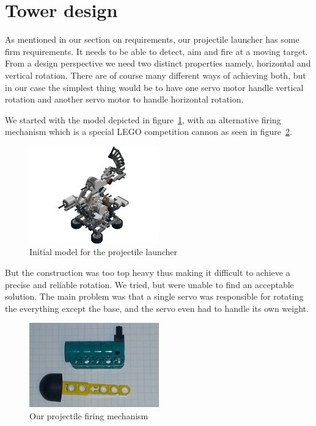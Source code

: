 \section{Tower design}
\label{turretdesign}
As mentioned in our section on requirements, our projectile launcher has some firm requirements. It needs to be able to detect, aim and fire at a moving target. 
From a design perspective we need two distinct properties namely, horizontal and vertical rotation. There are of course many different ways of achieving both, but in our case the simplest thing would be to have one servo motor handle vertical rotation and another servo motor to handle horizontal rotation. 

We started with the model depicted in figure~\ref{first_model}, with an alternative firing mechanism which is a special LEGO competition cannon as seen in figure~\ref{competition_cannon}. 

\begin{figure}[hptb]
  \centering
    \includegraphics[width=0.5\textwidth]{img/Step114.png}
  \caption{Initial model for the projectile launcher}
  \label{first_model}
\end{figure}

But the construction was too top heavy thus making it difficult to achieve a precise and reliable rotation. We tried, but were unable to find an acceptable solution. The main problem was that a single servo was responsible for rotating the everything except the base, and the servo even had to handle its own weight. 

\begin{figure}[hptb]
  \centering
    \includegraphics[width=0.5\textwidth]{img/competition_cannon.png}
  \caption{Our projectile firing mechanism}
  \label{competition_cannon}
\end{figure}

